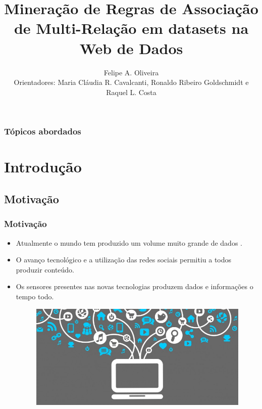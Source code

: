 \documentclass[hyperref={pdfpagelabels=false}]{beamer}
\title{Mineração de Regras de Associação de Multi-Relação em datasets na Web de Dados}
\author{Felipe A. Oliveira \\ Orientadores: Maria Cláudia R. Cavalcanti, Ronaldo Ribeiro Goldschmidt e Raquel L. Costa}
\institute {Mestrando em Sistemas e Computação \\ Instituto Militar de Engenharia }
\begin{document}
\begin{frame}
\titlepage
\end{frame} 

\begin{frame}
\frametitle{Tópicos abordados}
\small{\tableofcontents}
\end{frame} 

\section{Introdução}

\subsection{Motivação}

\begin{frame}
	\frametitle{Motivação}

		\begin{itemize}
        \item Atualmente o mundo tem produzido um volume muito grande de dados \cite{rezende2003mineraccao}. 		
        \item O avanço tecnológico e a utilização das redes sociais permitiu a todos produzir conteúdo. 
        \item  Os sensores presentes nas novas tecnologias produzem dados e informações o tempo todo.
        \begin{figure}[h]
	\centering
		\includegraphics[scale=0.2]{img/produzindodados}
	\label{fig:produzindodados}
\end{figure}	
     
   
        
	
	\end{itemize}		
\end{frame}
\end{document}
